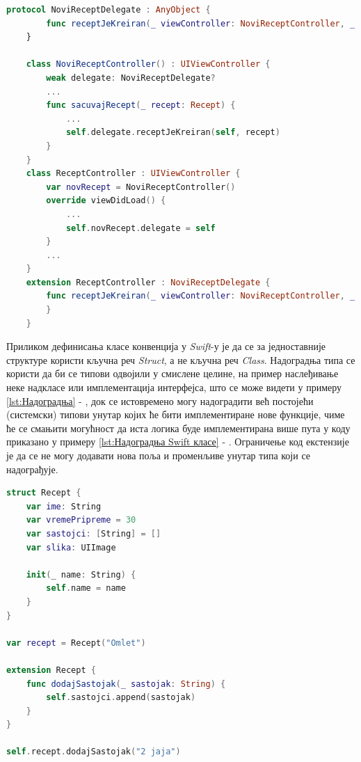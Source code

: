 \documentclass[12pt,oneside]{memoir}
\begin{document}
\begin{lstlisting}[caption=\textit{{Слаба референца}}, label={lst:Слаба референца}, language=Swift, frame=single]
    protocol NoviReceptDelegate : AnyObject {
        func receptJeKreiran(_ viewController: NoviReceptController, _ recept: Recept)
    }
    
    class NoviReceptController() : UIViewController {
        weak delegate: NoviReceptDelegate?
        ...
        func sacuvajRecept(_ recept: Recept) {
            ...
            self.delegate.receptJeKreiran(self, recept)
        }
    }
    class ReceptController : UIViewController {
        var novRecept = NoviReceptController()
        override viewDidLoad() {
            ...
            self.novRecept.delegate = self
        }
        ...
    }
    extension ReceptController : NoviReceptDelegate {
        func receptJeKreiran(_ viewController: NoviReceptController, _ recept: Recept) {
        }
    }
\end{lstlisting}

\indent Приликом дефинисања класе конвенција у \textit{Swift}-у је да се за једноставније структуре користи кључна реч \textit{Struct}, а не кључна реч \textit{Class}. Надоградња типа се користи да би се типови одвојили у смислене целине, на пример наслеђивање неке надкласе или имплементација интерфејса, што се може видети у примеру \ref{lst:Надоградња} - , док се истовремено могу надоградити већ постојећи (системски) типови унутар којих ће бити имплементиране нове функције, чиме ће се смањити могућност да иста логика буде имплементирана више пута у коду приказано у примеру \ref{lst:Надоградња Swift класе} - . Ограничење код екстензије је да се не могу додавати нова поља и променљиве унутар типа који се надограђује.

\begin{lstlisting}[caption=\textit{{Надоградња постојећег типа (класе, структуре)}}, label={lst:Надоградња}, language=Swift, frame=single]
struct Recept {
    var ime: String
    var vremePripreme = 30
    var sastojci: [String] = []
    var slika: UIImage

    init(_ name: String) {
        self.name = name
    }
}

var recept = Recept("Omlet")

extension Recept {
    func dodajSastojak(_ sastojak: String) {
        self.sastojci.append(sastojak)
    }
}

self.recept.dodajSastojak("2 jaja")
\end{lstlisting}
\end{document}
